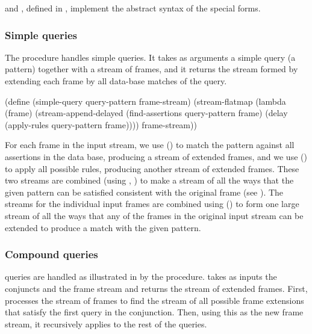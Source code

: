 \noindent
{} and , defined in , implement
the abstract syntax of the special forms.

\subsubsection*{Simple queries}

The  procedure handles simple queries.  It takes as
arguments a simple query (a pattern) together with a stream of frames, and it
returns the stream formed by extending each frame by all data-base matches of
the query.

\begin{codeBlock}
(define (simple-query query-pattern frame-stream)
  (stream-flatmap
   (lambda (frame)
     (stream-append-delayed
      (find-assertions query-pattern frame)
      (delay (apply-rules query-pattern frame))))
   frame-stream))
\end{codeBlock}

\noindent
For each frame in the input stream, we use 
() to match the pattern against all assertions in the data base,
producing a stream of extended frames, and we use 
() to apply all possible rules, producing another stream of
extended frames.  These two streams are combined (using
, ) to make a stream of all
the ways that the given pattern can be satisfied consistent with the original
frame (see ).  The streams for the individual input frames
are combined using  () to form one
large stream of all the ways that any of the frames in the original input
stream can be extended to produce a match with the given pattern.

\subsubsection*{Compound queries}

 queries are handled as illustrated in  by the
 procedure.   takes as inputs the conjuncts and the
frame stream and returns the stream of extended frames.  First, 
processes the stream of frames to find the stream of all possible frame
extensions that satisfy the first query in the conjunction.  Then, using this
as the new frame stream, it recursively applies  to the rest of
the queries.

